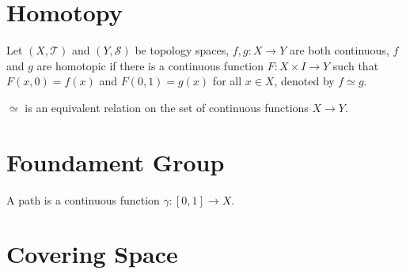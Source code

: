 \section{Homotopy}
\begin{defi}
Let $(X, \mathcal{T})$ and $(Y, \mathcal{S})$ be topology spaces,
$f, g : X \to Y$ are both continuous,
$f$ and $g$ are homotopic if there is a continuous function
$F : X \times I \to Y$ such that $F(x, 0) = f(x)$
and $F(0, 1) = g(x)$ for all $x \in X$, denoted by $f \simeq g$.
\end{defi}

\begin{pro}
$\simeq$ is an equivalent relation on the set of continuous functions $X \to Y$.
\end{pro}


\section{Foundament Group}
 A path is a continuous function $\gamma: [0, 1] \to X$.



\section{Covering Space}
